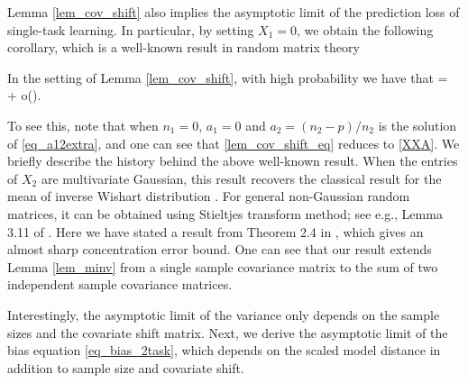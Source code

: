 Lemma \ref{lem_cov_shift} also implies the asymptotic limit of the prediction loss of single-task learning.
In particular, by setting $X_1 = 0$, we obtain the following corollary, which is a well-known result in random matrix theory
\begin{corollary}\label{lem_minv}
	In the setting of Lemma \ref{lem_cov_shift}, with high probability we have that
	\be\label{XXA}   =  \cdot {} + o(). \ee
\end{corollary} %
To see this, note that when $n_1=0$, $a_1 = 0$ and $a_2 = (n_2-p) / n_2$ is the solution of \eqref{eq_a12extra}, and one can see that \eqref{lem_cov_shift_eq} reduces to \eqref{XXA}.
We briefly describe the history behind the above well-known result.
When the entries of $X_2$ are multivariate Gaussian, this result recovers the classical result for the mean of inverse Wishart distribution \cite{anderson1958introduction}.
For general non-Gaussian random matrices, it can be obtained using Stieltjes transform method; see e.g., Lemma 3.11 of \cite{bai2009spectral}.
Here we have stated a result from Theorem 2.4 in \cite{isotropic}, which gives an almost sharp concentration error bound.
One can see that our result extends Lemma \ref{lem_minv} from a single sample covariance matrix to the sum of two independent sample covariance matrices.

Interestingly, the asymptotic limit of the variance only depends on the sample sizes and the covariate shift matrix.
Next, we derive the asymptotic limit of the bias equation \eqref{eq_bias_2task}, which depends on the scaled model distance in addition to sample size and covariate shift. %


